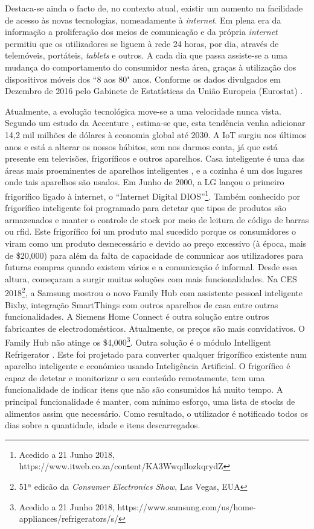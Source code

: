 Destaca-se ainda o facto de, no contexto atual, existir um aumento na facilidade de acesso às novas tecnologias, nomeadamente à \textit{internet}. Em plena era da informação a proliferação dos meios de comunicação e da própria \textit{internet} permitiu que os utilizadores se liguem à rede 24 horas, por dia, através de telemóveis, portáteis, \textit{tablets} e outros. A cada dia que passa assiste-se a uma mudança do comportamento do consumidor nesta área, graças à utilização dos dispositivos móveis dos ``8 aos 80" anos. Conforme os dados divulgados em Dezembro de 2016 pelo Gabinete de Estatísticas da União Europeia (Eurostat) \cite{eurostat:internetAccess2016}.

Atualmente, a evolução tecnológica move-se a uma velocidade nunca vista. %
Segundo um estudo da Accenture \cite{Accenture:2016}, estima-se que, esta tendência venha adicionar 14,2 mil milhões de dólares à economia global até 2030. A IoT surgiu nos últimos anos e está a alterar os nossos hábitos, sem nos darmos conta, já que está presente em televisões, frigoríficos e outros aparelhos. Casa inteligente é uma das áreas mais proeminentes de aparelhos inteligentes \cite{miller2015internet}, e a cozinha é um dos lugares onde tais aparelhos são usados.
Em Junho de 2000, a LG lançou o primeiro frigorífico ligado à internet, o ``Internet Digital DIOS''\footnote{Acedido a 21 Junho 2018, https://www.itweb.co.za/content/KA3WwqdlozkqrydZ}. Também conhecido por frigorífico inteligente foi programado para detetar que tipos de produtos são armazenados e manter o controle de stock por meio de leitura de código de barras ou \acrfull{rfid}. Este frigorífico foi um produto mal sucedido porque os consumidores o viram como um produto desnecessário e devido ao preço excessivo (à época, mais de \$20,000) para além da falta de capacidade de comunicar aos utilizadores para futuras compras quando existem vários e a comunicação é informal. Desde essa altura, começaram a surgir muitas soluções com mais funcionalidades. Na CES 2018\footnote{51ª edicão da \textit{Consumer Electronics Show}, Las Vegas, EUA}, a Samsung mostrou o novo Family Hub com assistente pessoal inteligente Bixby, integração SmartThings com outros aparelhos de casa entre outras funcionalidades. A Siemens Home Connect é outra solução entre outros fabricantes de electrodomésticos. Atualmente, os preços são mais convidativos. O Family Hub não atinge os \$4,000\footnote{Acedido a 21 Junho 2018, https://www.samsung.com/us/home-appliances/refrigerators/s/}. Outra solução é o módulo Intelligent Refrigerator \cite{shweta2017intelligent}. Este foi projetado para converter qualquer frigorífico existente num aparelho inteligente e económico usando Inteligência Artificial. O frigorífico é capaz de detetar e monitorizar o seu conteúdo remotamente, tem uma funcionalidade de indicar itens que não são consumidos há muito tempo. A principal funcionalidade é manter, com mínimo esforço, uma lista de stocks de alimentos assim que necessário. Como resultado, o utilizador é notificado todos os dias sobre a quantidade, idade e itens descarregados. 
%
%
